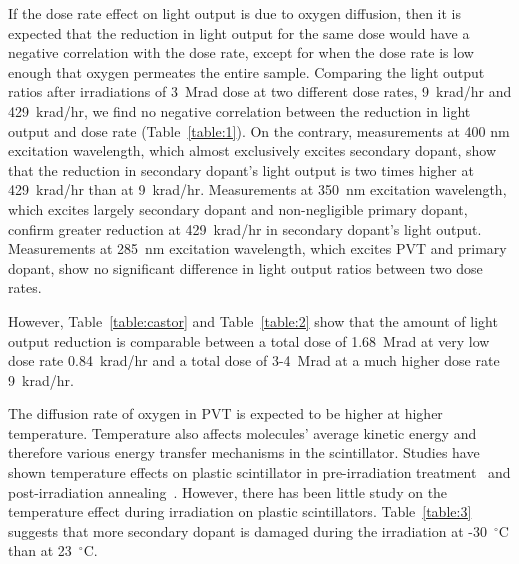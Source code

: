 \documentclass[preprint]{elsarticle}
\begin{document}
If the dose rate effect on light output is due to oxygen diffusion, then it is expected that the reduction in light output 
for the same dose would have a negative correlation with the dose rate, except for when the dose rate is low enough that 
oxygen permeates the entire sample. 
Comparing the light output ratios after irradiations of 3~Mrad dose at two different dose rates, 9~krad/hr and 429~krad/hr, 
we find no negative correlation between the reduction in light output and dose rate (Table~\ref{table:1}).
On the contrary, measurements at 400 nm excitation wavelength, which almost exclusively excites secondary dopant, 
show that the reduction in secondary dopant's light output is two times higher at 429~krad/hr than at 9~krad/hr.
Measurements at 350~nm excitation wavelength, which excites largely secondary dopant and non-negligible primary dopant, 
confirm greater reduction at 429~krad/hr in secondary dopant's light output. 
Measurements at 285~nm excitation wavelength, which excites PVT and primary dopant, show no significant difference 
in light output ratios between two dose rates. 

However, Table~\ref{table:castor} and Table~\ref{table:2} show that the amount of light output reduction is comparable 
between a total dose of 1.68~Mrad at very low dose rate 0.84~krad/hr and a total dose of 3-4~Mrad at a much higher dose rate 9~krad/hr.

The diffusion rate of oxygen in PVT is expected to be higher at higher temperature. 
Temperature also affects molecules' average kinetic energy and therefore various energy transfer mechanisms in the scintillator. 
Studies have shown temperature effects on plastic scintillator in pre-irradiation treatment~\cite{johnson} 
and post-irradiation annealing~\cite{birks1964}. 
However, there has been little study on the temperature effect during irradiation on plastic scintillators.
Table~\ref{table:3} suggests that more secondary dopant is damaged during the irradiation at -30~$^\circ$C than at 23~$^\circ$C.  
\end{document}
